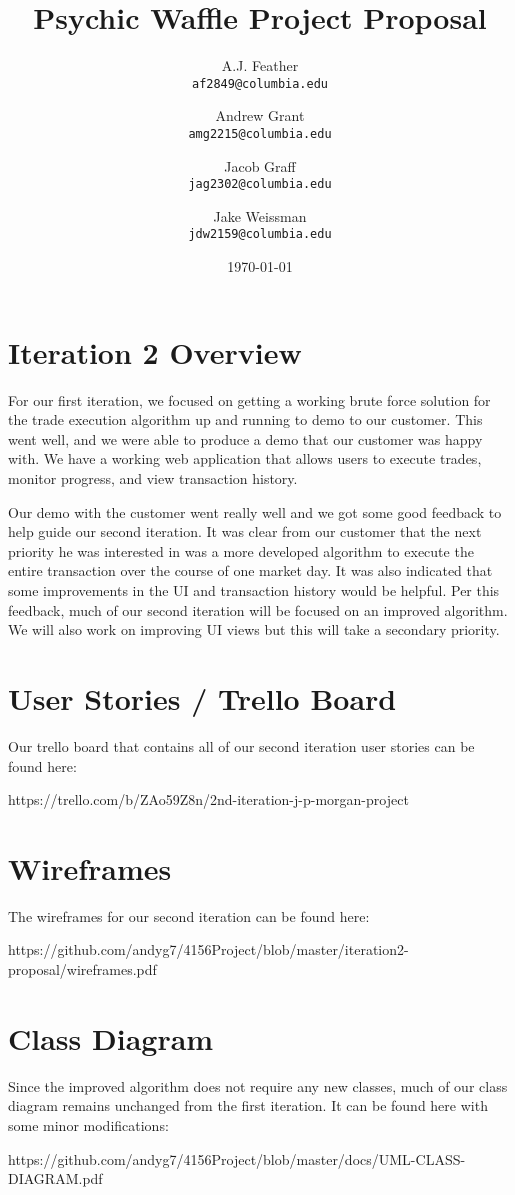 \documentclass{article}
\title{Psychic Waffle Project Proposal}
\author{
    A.J. Feather\\
    \texttt{af2849@columbia.edu}
    \and
    Andrew Grant\\
    \texttt{amg2215@columbia.edu}
    \and
    Jacob Graff\\
    \texttt{jag2302@columbia.edu}
    \and
    Jake Weissman\\
    \texttt{jdw2159@columbia.edu}
}
\date{\today}
\begin{document}
\maketitle

\section{Iteration 2 Overview}

For our first iteration, we focused on getting a working brute force solution for the trade execution algorithm up and running to demo to our customer. This went well, and we were able to produce a demo that our customer was happy with. We have a working web application that allows users to execute trades, monitor progress, and view transaction history.

Our demo with the customer went really well and we got some good feedback to help guide our second iteration. It was clear from our customer that the next priority he was interested in was a more developed algorithm to execute the entire transaction over the course of one market day. It was also indicated that some improvements in the UI and transaction history would be helpful. Per this feedback, much of our second iteration will be focused on an improved algorithm. We will also work on improving UI views but this will take a secondary priority.

\section{User Stories / Trello Board}

Our trello board that contains all of our second iteration user stories can be found here: 

https://trello.com/b/ZAo59Z8n/2nd-iteration-j-p-morgan-project

\section{Wireframes}

The wireframes for our second iteration can be found here:

https://github.com/andyg7/4156Project/blob/master/iteration2-proposal/wireframes.pdf


\section{Class Diagram}
Since the improved algorithm does not require any new classes, much of our class diagram remains unchanged from the first iteration. It can be found here with some minor modifications:

https://github.com/andyg7/4156Project/blob/master/docs/UML-CLASS-DIAGRAM.pdf
\end{document}
